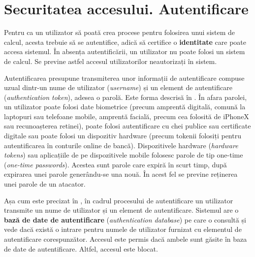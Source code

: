 
\section{Securitatea accesului.
Autentificare}
\label{sec:sec:auth}

Pentru ca un utilizator să poată crea procese pentru folosirea unui sistem de calcul, acesta trebuie să se autentifice, adică să certifice o \textbf{identitate} care poate accesa sistemul.
În absența autentificării, un utilizator nu poate folosi un sistem de calcul.
Se previne astfel accesul utilizatorilor neautorizați în sistem.

Autentificarea presupune transmiterea unor informații de autentificare compuse uzual dintr-un nume de utilizator (\textit{username}) și un element de autentificare (\textit{authentication token}), adesea o parolă.
Este forma descrisă în .
În afara parolei, un utilizator poate folosi date biometrice (precum amprentă digitală, comună la laptopuri sau telefoane mobile, amprentă facială, precum cea folosită de iPhoneX sau recunoașterea retinei), poate folosi autentificare cu chei publice sau certificate digitale sau poate folosi un dispozitiv hardware (precum tokenii folosiți pentru autentificarea în conturile online de bancă).
Dispozitivele hardware (\textit{hardware tokens}) sau aplicațiile de pe dispozitivele mobile folosesc parole de tip one-time (\textit{one-time passwords}).
Acestea sunt parole care expiră în scurt timp, după expirarea unei parole generându-se una nouă.
În acest fel se previne reținerea unei parole de un atacator.

Așa cum este precizat în , în cadrul procesului de autentificare un utilizator transmite un nume de utilizator și un element de autentificare.
Sistemul are o \textbf{bază de date de autentificare} (\textit{authentication database}) pe care o consultă și vede dacă există o intrare pentru numele de utilizator furnizat cu elementul de autentificare corespunzător.
Accesul este permis dacă ambele sunt găsite în baza de date de autentificare.
Altfel, accesul este blocat.

